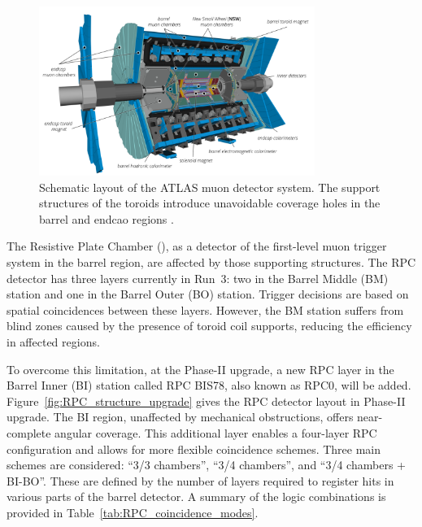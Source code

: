 \begin{figure}[htbp]
  \centering
  \includegraphics[width=0.8\textwidth]{figs/chapter4/ATLAS_muon_detectors_and_toroids3.png}
  \caption{Schematic layout of the ATLAS muon detector system. The support structures of the toroids introduce unavoidable coverage holes in the barrel and endcao regions \cite{ATLASRun3Detector}.}
  \label{fig:ATLAS_muon_geometry}
\end{figure}

The Resistive Plate Chamber (\RPC), as a detector of the first-level muon trigger system in the barrel region, are affected by those supporting structures. The RPC detector has three layers currently in Run~3: two in the Barrel Middle (BM) station and one in the Barrel Outer (BO) station. Trigger decisions are based on spatial coincidences between these layers. However, the BM station suffers from blind zones caused by the presence of toroid coil supports, reducing the efficiency in affected regions.

To overcome this limitation, at the Phase-II upgrade, a new RPC layer in the Barrel Inner (BI) station called RPC BIS78, also known as RPC0, will be added. Figure~\ref{fig:RPC_structure_upgrade} gives the RPC detector layout in Phase-II upgrade. The BI region, unaffected by mechanical obstructions, offers near-complete angular coverage. This additional layer enables a four-layer RPC configuration and allows for more flexible coincidence schemes. Three main schemes are considered: “3/3 chambers”, “3/4 chambers”, and “3/4 chambers + BI-BO”. These are defined by the number of layers required to register hits in various parts of the barrel detector. A summary of the logic combinations is provided in Table~\ref{tab:RPC_coincidence_modes}.


